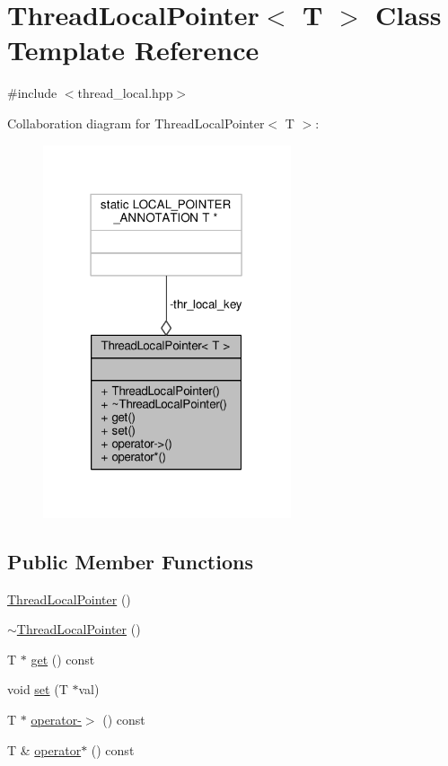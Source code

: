 \hypertarget{classThreadLocalPointer}{\section{Thread\-Local\-Pointer$<$ T $>$ Class Template Reference}
\label{classThreadLocalPointer}
}


{\ttfamily \#include $<$thread\-\_\-local.\-hpp$>$}



Collaboration diagram for Thread\-Local\-Pointer$<$ T $>$\-:
\nopagebreak
\begin{figure}[H]
\begin{center}
\leavevmode
\includegraphics[width=207pt]{classThreadLocalPointer__coll__graph}
\end{center}
\end{figure}
\subsection*{Public Member Functions}
\begin{DoxyCompactItemize}
\item 
\hyperlink{classThreadLocalPointer_ad715f8eec1f28bd65e8e61aeea984932}{Thread\-Local\-Pointer} ()
\item 
\hyperlink{classThreadLocalPointer_a45b9217b7e2047301c7a3430584ab466}{$\sim$\-Thread\-Local\-Pointer} ()
\item 
T $\ast$ \hyperlink{classThreadLocalPointer_ae9c140a2ebb545cb5f77de40ad7ef75d}{get} () const 
\item 
void \hyperlink{classThreadLocalPointer_a7aab8b97729c24d294a961136d87b905}{set} (T $\ast$val)
\item 
T $\ast$ \hyperlink{classThreadLocalPointer_a18ef9ed743c47e2cf8c8eec764726fa0}{operator-\/$>$} () const 
\item 
T \& \hyperlink{classThreadLocalPointer_ae779db7b336460454f746eac86acb1dd}{operator$\ast$} () const 
\end{DoxyCompactItemize}
